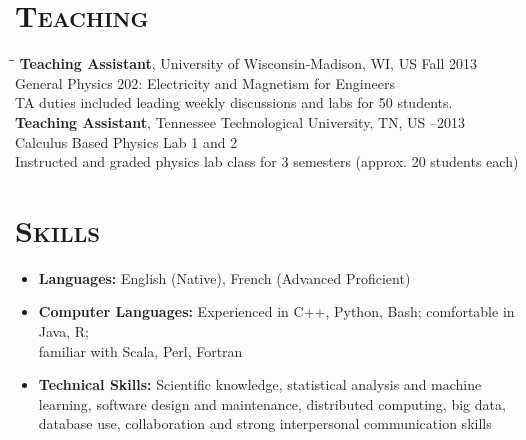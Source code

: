 \documentclass[10pt]{res} %
\begin{document}
\begin{resume}
\section{\textsc{Teaching}}
\vspace{-0.1in}

\begin{tabbing}
\hspace{3.5 in}\= \hspace{1.4in}\= \kill %
\textbf{Teaching Assistant}, University of Wisconsin-Madison, WI, US \>\> Fall 2013 \\
General Physics 202: Electricity and Magnetism for Engineers \\
TA duties included leading weekly discussions and labs for 50 students. \\
\textbf{Teaching Assistant}, Tennessee Technological University, TN, US \>--2013 \\
Calculus Based Physics Lab 1 and 2 \\
Instructed and graded physics lab class for 3 semesters (approx. 20 students each) \\
\end{tabbing}\vspace{-20pt}      %

\section{\textsc{Skills}}
\begin{itemize}
\item \textbf{Languages:} English (Native), French (Advanced Proficient)
\item \textbf{Computer Languages:} Experienced in C++, Python, Bash; comfortable in Java, R; \\ familiar with Scala, Perl, Fortran
\item \textbf{Technical Skills:} Scientific knowledge, statistical analysis and machine learning, software design and maintenance, distributed computing, big data, database use, collaboration and strong interpersonal communication skills
\end{itemize} 

\end{resume}
\end{document}
